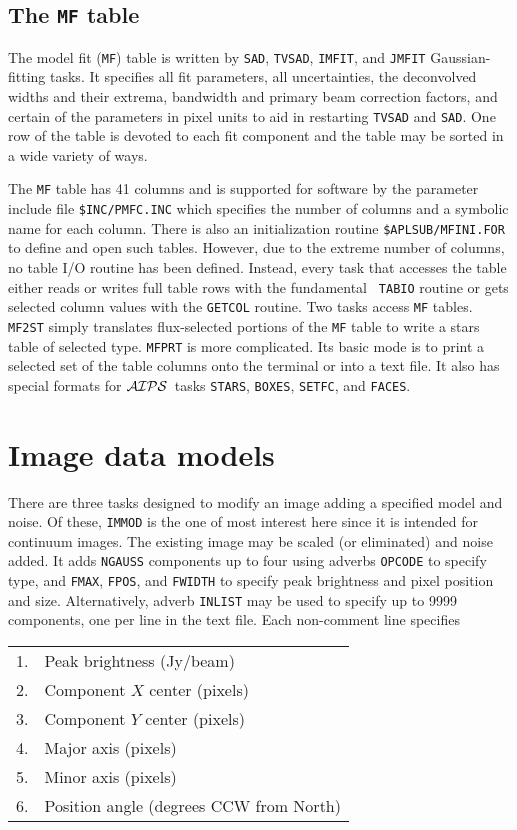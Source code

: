 \documentclass[twoside]{article}
\newcommand{\AIPS}{{$\cal AIPS\/$}}
\begin{document}
\subsection{The {\tt MF} table}

The model fit ({\tt MF}) table is written by {\tt SAD}, {\tt TVSAD},
{\tt IMFIT}, and {\tt JMFIT} Gaussian-fitting tasks.  It specifies all
fit parameters, all uncertainties, the deconvolved widths and their
extrema, bandwidth and primary beam correction factors, and certain
of the parameters in pixel units to aid in restarting {\tt TVSAD} and
{\tt SAD}\@.   One row of the table is devoted to each fit component
and the table may be sorted in a wide variety of ways.

The {\tt MF} table has 41 columns and is supported for software by the
parameter include file {\tt \$INC/PMFC.INC} which specifies the number
of columns and a symbolic name for each column.  There is also an
initialization routine {\tt \$APLSUB/MFINI.FOR} to define and open
such tables.  However, due to the extreme number of columns, no table
I/O routine has been defined.  Instead, every task that accesses the
table either reads or writes full table rows with the fundamental {\tt
  TABIO} routine or gets selected column values with the {\tt GETCOL}
routine.  Two tasks access {\tt MF} tables.  {\tt MF2ST} simply
translates flux-selected portions of the {\tt MF} table to write a
stars table of selected type.  {\tt MFPRT} is more complicated.  Its
basic mode is to print a selected set of the table columns onto the
terminal or into a text file.  It also has special formats for \AIPS\
tasks {\tt STARS}, {\tt BOXES}, {\tt SETFC}, and {\tt FACES}\@.

\section{Image data models}

There are three tasks designed to modify an image adding a specified
model and noise.  Of these, {\tt IMMOD} is the one of most interest
here since it is intended for continuum images.  The existing image
may be scaled (or eliminated) and noise added.  It adds {\tt NGAUSS}
components up to four using adverbs {\tt OPCODE} to specify type, and
{\tt FMAX}, {\tt FPOS}, and {\tt FWIDTH} to specify peak brightness
and pixel position and size.  Alternatively, adverb {\tt INLIST} may
be used to specify up to 9999 components, one per line in the text
file. Each non-comment line specifies
\begin{center}
\begin{tabular}{|r|l|}\hline
 1. & Peak brightness (Jy/beam)\\
 2. & Component $X$ center (pixels)\\
 3. & Component $Y$ center (pixels)\\
 4. & Major axis (pixels)\\
 5. & Minor axis (pixels)\\
 6. & Position angle (degrees CCW from North)\\ \hline
\end{tabular}
\end{center}
\end{document}
